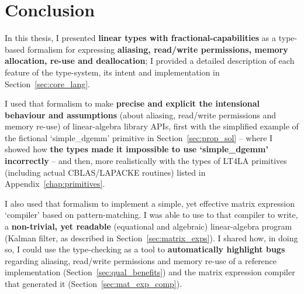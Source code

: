 \chapter{Conclusion}

%

In this thesis, I presented \textbf{linear types with fractional-capabilities}
as a type-based formalism for expressing \textbf{aliasing, read/write
permissions, memory allocation, re-use and deallocation}; I provided a detailed
description of each feature of the type-system, its intent and implementation
in Section~\ref{sec:core_lang}.

I used that formalism to make \textbf{precise and explicit the intensional
behaviour and assumptions} (about aliasing, read/write permissions and memory
re-use) of linear-algebra library APIs, first with the simplified example of
the fictional `simple\_dgemm' primitive in Section~\ref{sec:prop_sol} -- where
I showed how \textbf{the types made it impossible to use `simple\_dgemm'
incorrectly} -- and then, more realistically with the types of LT4LA primitives
(including actual CBLAS/LAPACKE routines) listed in
Appendix~\ref{chap:primitives}.

I also used that formalism to implement a simple, yet effective matrix
expression `compiler' based on pattern-matching. I was able to use to that
compiler to write, a \textbf{non-trivial, yet readable} (equational and
algebraic) linear-algebra program (Kalman filter, as described in
Section~\ref{sec:matrix_exps}). I shared how, in doing so, I could use the
type-checking as a tool to \textbf{automatically highlight bugs} regarding
aliasing, read/write permissions and memory re-use of a reference
implementation (Section~\ref{sec:qual_benefits}) and the matrix expression
compiler that generated it (Section~\ref{sec:mat_exp_comp}).


